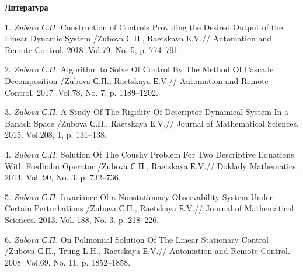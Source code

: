 \smallskip \centerline {\bf Литература} \nopagebreak


1. {\it  Zubova С.П.} Construction of Controls Providing the Desired Output of the Linear Dynamic System /Zubova С.П., Raetskaya Е.V.// Automation and Remote Control. 2018 .Vol.79, No. 5, p. 774--791.

2. {\it Zubova С.П.} Algorithm to Solve Of Control By The Method Of Cascade Decomposition /Zubova С.П., Raetskaya Е.V.// Automation and Remote Control. 2017 .Vol.78, No. 7, p. 1189--1202.

3. {\it Zubova С.П.} A Study Of The Rigidity Of Descriptor Dynamical System In a Banach Space /Zubova С.П., Raetskaya Е.V.// Journal of Mathematical Sciences. 2015. Vol.208, 1, p. 131--138.


4. {\it Zubova С.П.} Solution Of The Coushy Problem For Two Descriptive Equations With Fredholm Operator /Zubova С.П., Raetskaya Е.V.//
Doklady Mathematics. 2014. Vol. 90, No. 3. p. 732--736.

5. {\it Zubova С.П.} Invariance Of a Nonstationary Observability System Under Certain Perturbations /Zubova С.П., Raetskaya Е.V.// Journal of Mathematical Sciences. 2013. Vol. 188, No. 3. p. 218--226.

6. {\it Zubova С.П.} On Polinomial Solution Of The Linear Stationary Control /Zubova С.П., Trung L.H., Raetskaya Е.V.// Automation and Remote Control. 2008 .Vol.69, No. 11, p. 1852--1858.
